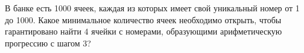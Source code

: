 \question 
В банке есть 1000 ячеек, каждая из которых имеет свой уникальный номер от 1 до 1000. Какое минимальное количество ячеек необходимо открыть, чтобы гарантировано найти 4 ячейки с номерами, образующими арифметическую прогрессию с шагом 3?

